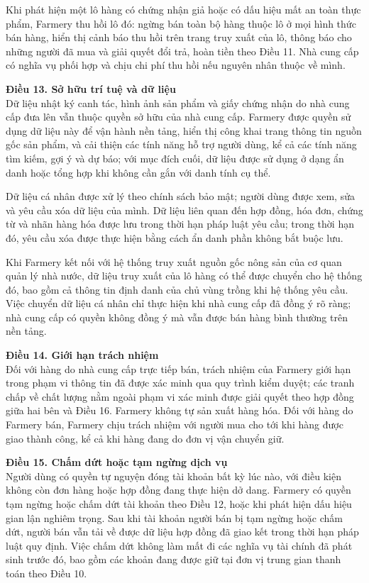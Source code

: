 Khi phát hiện một lô hàng có chứng nhận giả hoặc có dấu hiệu mất an toàn thực
phẩm, Farmery thu hồi lô đó: ngừng bán toàn bộ hàng thuộc lô ở mọi hình thức
bán hàng, hiển thị cảnh báo thu hồi trên trang truy xuất của lô, thông báo cho
những người đã mua và giải quyết đổi trả, hoàn tiền theo Điều 11. Nhà cung cấp
có nghĩa vụ phối hợp và chịu chi phí thu hồi nếu nguyên nhân thuộc về mình.

\noindent\textbf{Điều 13. Sở hữu trí tuệ và dữ liệu}\\
Dữ liệu nhật ký canh tác, hình ảnh sản phẩm và giấy chứng nhận do nhà cung
cấp đưa lên vẫn thuộc quyền sở hữu của nhà cung cấp. Farmery được quyền sử
dụng dữ liệu này để vận hành nền tảng, hiển thị công khai trang thông tin
nguồn gốc sản phẩm, và cải thiện các tính năng hỗ trợ người dùng, kể cả các
tính năng tìm kiếm, gợi ý và dự báo; với mục đích cuối, dữ liệu được sử dụng
ở dạng ẩn danh hoặc tổng hợp khi không cần gắn với danh tính cụ thể.

Dữ liệu cá nhân được xử lý theo chính sách bảo mật; người dùng được xem, sửa
và yêu cầu xóa dữ liệu của mình. Dữ liệu liên quan đến hợp đồng, hóa đơn,
chứng từ và nhãn hàng hóa được lưu trong thời hạn pháp luật yêu cầu; trong
thời hạn đó, yêu cầu xóa được thực hiện bằng cách ẩn danh phần không bắt
buộc lưu.

Khi Farmery kết nối với hệ thống truy xuất nguồn gốc nông sản của cơ quan
quản lý nhà nước, dữ liệu truy xuất của lô hàng có thể được chuyển cho hệ
thống đó, bao gồm cả thông tin định danh của chủ vùng trồng khi hệ thống yêu
cầu. Việc chuyển dữ liệu cá nhân chỉ thực hiện khi nhà cung cấp đã đồng ý rõ
ràng; nhà cung cấp có quyền không đồng ý mà vẫn được bán hàng bình thường trên
nền tảng.

\noindent\textbf{Điều 14. Giới hạn trách nhiệm}\\
Đối với hàng do nhà cung cấp trực tiếp bán, trách nhiệm của Farmery giới hạn
trong phạm vi thông tin đã được xác minh qua quy trình kiểm duyệt; các tranh
chấp về chất lượng nằm ngoài phạm vi xác minh được giải quyết theo hợp đồng
giữa hai bên và Điều 16. Farmery không tự sản xuất hàng hóa. Đối với hàng do
Farmery bán, Farmery chịu trách nhiệm với người mua cho tới khi hàng được giao
thành công, kể cả khi hàng đang do đơn vị vận chuyển giữ.

\noindent\textbf{Điều 15. Chấm dứt hoặc tạm ngừng dịch vụ}\\
Người dùng có quyền tự nguyện đóng tài khoản bất kỳ lúc nào, với điều kiện
không còn đơn hàng hoặc hợp đồng đang thực hiện dở dang. Farmery có quyền tạm
ngừng hoặc chấm dứt tài khoản theo Điều 12, hoặc khi phát hiện dấu hiệu gian
lận nghiêm trọng. Sau khi tài khoản người bán bị tạm ngừng hoặc chấm dứt, người
bán vẫn tải về được dữ liệu hợp đồng đã giao kết trong thời hạn pháp luật quy
định. Việc chấm dứt không làm mất đi các nghĩa vụ tài chính đã phát sinh trước
đó, bao gồm các khoản đang được giữ tại đơn vị trung gian thanh toán theo
Điều 10.

